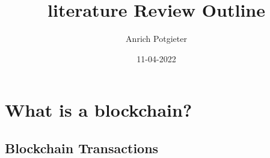 \documentclass[12pt]{article}
\title{literature Review Outline}
\author{Anrich Potgieter}
\date{11-04-2022}
\begin{document}
\maketitle
\tableofcontents

\section{What is a blockchain?}
\subsection{Blockchain Transactions}
\end{document}
